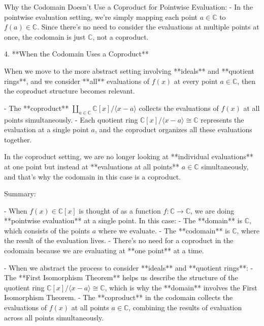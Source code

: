 \documentclass[11pt,openany]{article}
\begin{document}
Why the Codomain Doesn’t Use a Coproduct for Pointwise Evaluation:
- In the pointwise evaluation setting, we’re simply mapping each point \( a \in \mathbb{C} \) to \( f(a) \in \mathbb{C} \). Since there’s no need to consider the evaluations at multiple points at once, the codomain is just \( \mathbb{C} \), not a coproduct.

4. **When the Codomain Uses a Coproduct**

When we move to the more abstract setting involving **ideals** and **quotient rings**, and we consider **all** evaluations of \( f(x) \) at every point \( a \in \mathbb{C} \), then the coproduct structure becomes relevant.

- The **coproduct** \( \coprod_{a \in \mathbb{C}} \mathbb{C}[x] / \langle x - a \rangle \) collects the evaluations of \( f(x) \) at all points simultaneously.
- Each quotient ring \( \mathbb{C}[x] / \langle x - a \rangle \cong \mathbb{C} \) represents the evaluation at a single point \( a \), and the coproduct organizes all these evaluations together.

In the coproduct setting, we are no longer looking at **individual evaluations** at one point but instead at **evaluations at all points** \( a \in \mathbb{C} \) simultaneously, and that’s why the codomain in this case is a coproduct.

Summary:

- When \( f(x) \in \mathbb{C}[x] \) is thought of as a function \( f: \mathbb{C} \to \mathbb{C} \), we are doing **pointwise evaluation** at a single point. In this case:
- The **domain** is \( \mathbb{C} \), which consists of the points \( a \) where we evaluate.
- The **codomain** is \( \mathbb{C} \), where the result of the evaluation lives.
- There's no need for a coproduct in the codomain because we are evaluating at **one point** at a time.

- When we abstract the process to consider **ideals** and **quotient rings**:
- The **First Isomorphism Theorem** helps us describe the structure of the quotient ring \( \mathbb{C}[x] / \langle x - a \rangle \cong \mathbb{C} \), which is why the **domain** involves the First Isomorphism Theorem.
- The **coproduct** in the codomain collects the evaluations of \( f(x) \) at all points \( a \in \mathbb{C} \), combining the results of evaluation across all points simultaneously.
\end{document}
